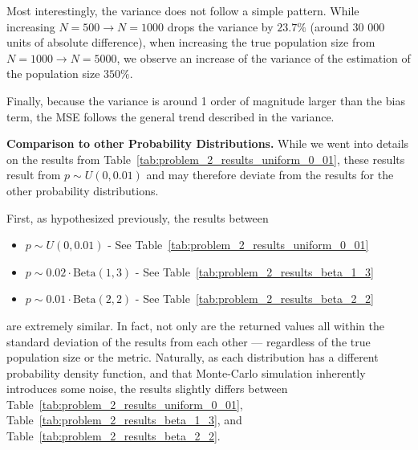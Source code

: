 \documentclass{article}
\begin{document}
Most interestingly, the variance does not follow a simple pattern. While increasing $N=500 \to N=1000$ drops the variance by $23.7\%$ (around 30 000 units of absolute difference), when increasing the true population size from $N=1000 \to N=5000$, we observe an increase of the variance of the estimation of the population size $350\%$.

Finally, because the variance is around 1 order of magnitude larger than the bias term, the MSE follows the general trend described in the variance.

\textbf{Comparison to other Probability Distributions.}
While we went into details on the results from Table~\ref{tab:problem_2_results_uniform_0_01}, these results result from $p\sim U(0, 0.01)$ and may therefore deviate from the results for the other probability distributions.

First, as hypothesized previously, the results between 
\begin{itemize}
    \item $p \sim U(0, 0.01)$ - See Table~\ref{tab:problem_2_results_uniform_0_01}
    \item $p \sim 0.02 \cdot \mathrm{Beta}(1, 3)$ - See Table~\ref{tab:problem_2_results_beta_1_3}
    \item $p \sim 0.01 \cdot \mathrm{Beta}(2, 2)$ - See Table~\ref{tab:problem_2_results_beta_2_2}
\end{itemize}
are extremely similar.
In fact, not only are the returned values all within the standard deviation of the results from each other --- regardless of the true population size or the metric.
Naturally, as each distribution has a different probability density function, and that Monte-Carlo simulation inherently introduces some noise, the results slightly differs between Table~\ref{tab:problem_2_results_uniform_0_01}, Table~\ref{tab:problem_2_results_beta_1_3}, and Table~\ref{tab:problem_2_results_beta_2_2}.
\end{document}
